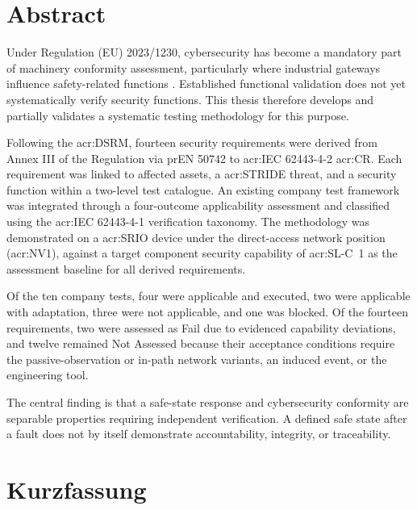 \chapter*{Abstract} %

Under Regulation (EU) 2023/1230, cybersecurity has become a mandatory part of machinery conformity assessment, particularly where industrial gateways influence safety-related functions \cite[p. 4]{EU2023_1230}. Established functional validation does not yet systematically verify security functions. This thesis therefore develops and partially validates a systematic testing methodology for this purpose.

Following the \gls{acr:DSRM}, fourteen security requirements were derived from Annex III of the Regulation via prEN 50742 to \acrshort{acr:IEC} 62443-4-2 \acrfull{acr:CR}. Each requirement was linked to affected assets, a \acrshort{acr:STRIDE} threat, and a security function within a two-level test catalogue. An existing company test framework was integrated through a four-outcome applicability assessment and classified using the \acrshort{acr:IEC} 62443-4-1 verification taxonomy. The methodology was demonstrated on a \gls{acr:SRIO} device under the direct-access network position (\acrshort{acr:NV1}), against a target component security capability of \acrshort{acr:SL-C}~1 as the assessment baseline for all derived requirements.

Of the ten company tests, four were applicable and executed, two were applicable with adaptation, three were not applicable, and one was blocked. Of the fourteen requirements, two were assessed as Fail due to evidenced capability deviations, and twelve remained Not Assessed because their acceptance conditions require the passive-observation or in-path network variants, an induced event, or the engineering tool.

The central finding is that a safe-state response and cybersecurity conformity are separable properties requiring independent verification. A defined safe state after a fault does not by itself demonstrate accountability, integrity, or traceability.

\clearpage

\chapter*{Kurzfassung} %

